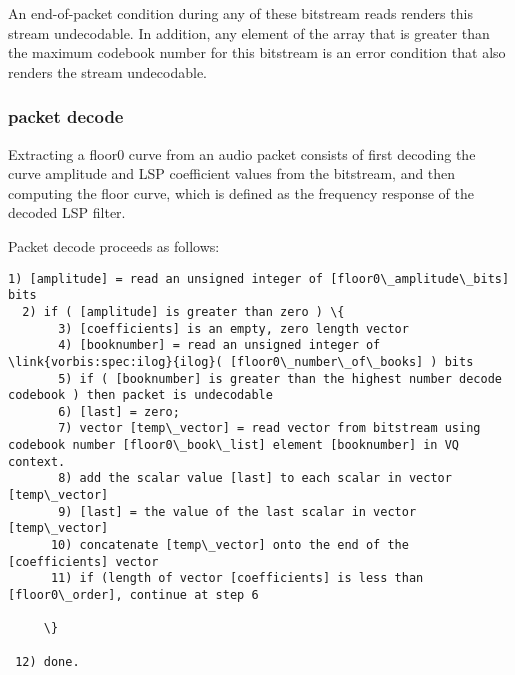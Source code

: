 An end-of-packet condition during any of these bitstream reads renders
this stream undecodable.  In addition, any element of the array
 that is greater than the maximum codebook
number for this bitstream is an error condition that also renders the
stream undecodable.



\subsubsection{packet decode} \label{vorbis:spec:floor0-decode}

Extracting a floor0 curve from an audio packet consists of first
decoding the curve amplitude and  LSP
coefficient values from the bitstream, and then computing the floor
curve, which is defined as the frequency response of the decoded LSP
filter.

Packet decode proceeds as follows:
\begin{Verbatim}[commandchars=\\\{\}]
  1) [amplitude] = read an unsigned integer of [floor0\_amplitude\_bits] bits
  2) if ( [amplitude] is greater than zero ) \{
       3) [coefficients] is an empty, zero length vector
       4) [booknumber] = read an unsigned integer of \link{vorbis:spec:ilog}{ilog}( [floor0\_number\_of\_books] ) bits
       5) if ( [booknumber] is greater than the highest number decode codebook ) then packet is undecodable
       6) [last] = zero;
       7) vector [temp\_vector] = read vector from bitstream using codebook number [floor0\_book\_list] element [booknumber] in VQ context.
       8) add the scalar value [last] to each scalar in vector [temp\_vector]
       9) [last] = the value of the last scalar in vector [temp\_vector]
      10) concatenate [temp\_vector] onto the end of the [coefficients] vector
      11) if (length of vector [coefficients] is less than [floor0\_order], continue at step 6

     \}

 12) done.

\end{Verbatim}

